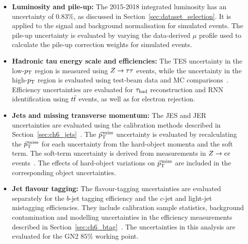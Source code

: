 \begin{itemize}[nosep,leftmargin=*]
\item \textbf{Luminosity and pile-up:}
\label{subsec:ch9_lumi_pileup}
The 2015-2018 integrated luminosity has an uncertainty of $0.83\%$, as discussed in Section~\ref{sec:dataset_selection}.
It is applied to the signal and background normalisation for simulated events.
The pile-up uncertainty is evaluated by varying the data-derived $\mu$ profile used to calculate the pile-up correction weights for simulated events.

\item \textbf{Hadronic tau energy scale and efficiencies:}
\label{subsec:ch9_tau}
The TES uncertainty in the low-$p_{\mathrm{T}}$ region is measured using $Z\rightarrow\tau\tau$ events, while the uncertainty in the high-$p_{\mathrm{T}}$ region is evaluated using test-beam data and MC comparisons~\cite{Hubner2018TauPerformance,ATL-PHYS-PUB-2015-045}.
Efficiency uncertainties are evaluated for $\tau_{\mathrm{had}}$ reconstruction and RNN identification using $t\bar{t}$ events, as well as for electron rejection.

\item \textbf{Jets and missing transverse momentum:}
\label{subsec:ch9_jets_met}
The JES and JER uncertainties are evaluated using the calibration methods described in Section~\ref{sec:ch6_jets}~\cite{ATLAS2021JetCalibration}.
The $\vec p_{\mathrm{T}}^{\,\mathrm{miss}}$ uncertainty is evaluated by recalculating the $\vec p_{\mathrm{T}}^{\,\mathrm{miss}}$ for each uncertainty from the hard-object momenta and the soft term.
The soft-term uncertainty is derived from measurements in $Z\rightarrow ee$ events~\cite{ATLAS2025METPerformance}.
The effects of hard-object variations on $\vec p_{\mathrm{T}}^{\,\mathrm{miss}}$ are included in the corresponding object uncertainties.

\item \textbf{Jet flavour tagging:}
\label{subsec:ch9_ftag}
The flavour-tagging uncertainties are evaluated separately for the $b$-jet tagging efficiency and the $c$-jet and light-jet mistagging efficiencies.
They include calibration sample statistics, background contamination and modelling uncertainties in the efficiency measurements described in Section~\ref{sec:ch6_btag}~\cite{ATLAS2026GN2}. The uncertainties in this analysis are evaluated for the GN2 $85\%$ working point.


\end{itemize}
